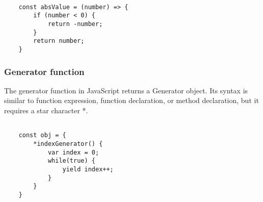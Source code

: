 \documentclass{scrartcl}
\begin{document}
\begin{lstlisting}[style=ES6]

    const absValue = (number) => {
        if (number < 0) {
            return -number;
        }
        return number;
    }

\end{lstlisting}

\subsubsection{Generator function}

The generator function in JavaScript returns a Generator object.
Its syntax is similar to function expression, function declaration, or method declaration, but it requires a star character *.

\begin{lstlisting}[style=ES6]

    const obj = {
        *indexGenerator() {
            var index = 0;
            while(true) {
                yield index++;
            }
        }
    }

\end{lstlisting}
\end{document}
